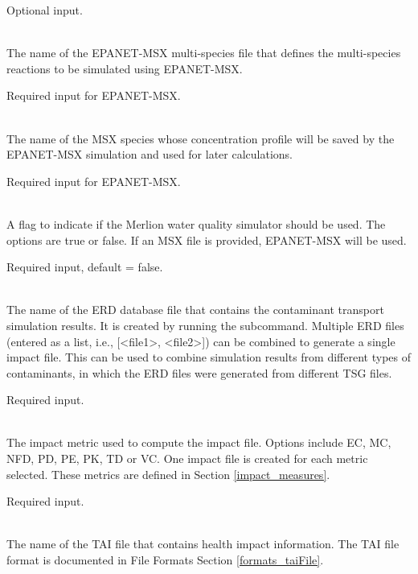 \begin{description}[topsep=0pt,parsep=0.5em,itemsep=-0.4em]
\begin{description}[topsep=0pt,parsep=0.5em,itemsep=-0.4em]
                Optional input.
    \item[{msx file}]\hfill
\\The name of the EPANET-MSX multi-species file that defines the multi-species reactions to
                be simulated using EPANET-MSX.
                
                Required input for EPANET-MSX.
    \item[{msx species}]\hfill
\\The name of the MSX species whose concentration profile will be saved by the EPANET-MSX simulation
                and used for later calculations.
                
                Required input for EPANET-MSX.
    \item[{merlion}]\hfill
\\A flag to indicate if the Merlion water quality
                simulator should be used. The options are true or false. 
                If an MSX file is provided, EPANET-MSX will be used.
                
                Required input, default = false.
  \end{description}
  \item[{impact}]\hfill
  \begin{description}[topsep=0pt,parsep=0.5em,itemsep=-0.4em]
    \item[{erd file}]\hfill
\\The name of the ERD database file that contains the 
                contaminant transport simulation results. It is 
                created by running the  subcommand.
                Multiple ERD files (entered as a list, i.e., [<file1>, <file2>]) can be combined to
                generate a single impact file. This can be used to combine
                simulation results from different types of contaminants, in
                which the ERD files were generated from different
                TSG files.
                
                Required input.
    \item[{metric}]\hfill
\\The impact metric used to compute the impact file. Options
                include EC, MC, NFD, PD, PE, PK, TD or VC. One impact file 
                is created for each metric selected. These metrics are 
                defined in Section \ref{impact_measures}.
                
                Required input.
    \item[{tai file}]\hfill
\\The name of the TAI file that contains health impact information. 
                The TAI file format is documented in File Formats Section \ref{formats_taiFile}.
                

\end{description}
\end{description}
